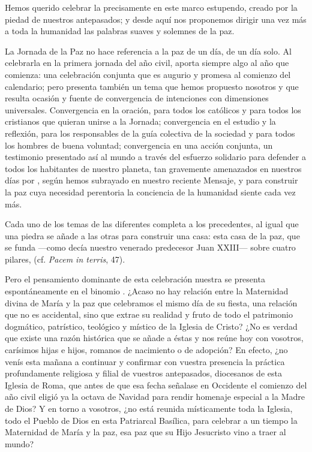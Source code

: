 Hemos querido celebrar la  precisamente en este marco estupendo, creado por la piedad de nuestros antepasados; y desde aquí nos proponemos dirigir una vez más a toda la humanidad las palabras suaves y solemnes de la paz.

La Jornada de la Paz no hace referencia a la paz de un día, de un día solo. Al celebrarla en la primera jornada del año civil, aporta siempre algo al año que comienza: una celebración conjunta que es augurio y promesa al comienzo del calendario; pero presenta también un tema que hemos propuesto nosotros y que resulta ocasión y fuente de convergencia de intenciones con dimensiones universales. Convergencia en la oración, para todos los católicos y para todos los cristianos que quieran unirse a la Jornada; convergencia en el estudio y la reflexión, para los responsables de la guía colectiva de la sociedad y para todos los hombres de buena voluntad; convergencia en una acción conjunta, un testimonio presentado así al mundo a través del esfuerzo solidario para defender a todos los habitantes de nuestro planeta, tan gravemente amenazados en nuestros días por , según hemos subrayado en nuestro reciente Mensaje, y para construir la paz cuya necesidad perentoria la conciencia de la humanidad siente cada vez más.

Cada uno de los temas de las diferentes  completa a los precedentes, al igual que una piedra se añade a las otras para construir una casa: esta casa de la paz, que se funda ---como decía nuestro venerado predecesor Juan XXIII--- sobre cuatro pilares,  (cf. \emph{Pacem in terris}, 47).

Pero el pensamiento dominante de esta celebración nuestra se presenta espontáneamente en el binomio . ¿Acaso no hay relación entre la Maternidad divina de María y la paz que celebramos el mismo día de su fiesta, una relación que no es accidental, sino que extrae su realidad y fruto de todo el patrimonio dogmático, patrístico, teológico y místico de la Iglesia de Cristo? ¿No es verdad que existe una razón histórica que se añade a éstas y nos reúne hoy con vosotros, carísimos hijas e hijos, romanos de nacimiento o de adopción? En efecto, ¿no venís esta mañana a continuar y confirmar con vuestra presencia la práctica profundamente religiosa y filial de vuestros antepasados, diocesanos de esta Iglesia de Roma, que antes de que esa fecha señalase en Occidente el comienzo del año civil eligió ya la octava de Navidad para rendir homenaje especial a la Madre de Dios? Y en torno a vosotros, ¿no está reunida místicamente toda la Iglesia, todo el Pueblo de Dios en esta Patriarcal Basílica, para celebrar a un tiempo la Maternidad de María y la paz, esa paz que su Hijo Jesucristo vino a traer al mundo?

